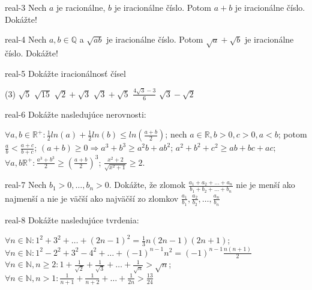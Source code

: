 \begin{defproblem}{real-3}
Nech $a$ je racionálne, $b$ je iracionálne číslo. Potom $a + b$ je
iracionálne číslo. Dokážte!
\end{defproblem}

\begin{defproblem}{real-4}
Nech $a, b \in \mathbb{Q}$ a $\sqrt{ab}$ je iracionálne číslo. Potom
$\sqrt{a} + \sqrt{b}$ je iracionálne číslo. Dokážte!
\end{defproblem}

\begin{defproblem}{real-5}
Dokážte iracionálnosť čísel

\begin{tasks}(3)
  \task $\sqrt{5}$
  \task $\sqrt{15}$
  \task $\sqrt{2} + \sqrt{3}$
  \task $\sqrt{3} + \sqrt{5}$
  \task $\frac{4\sqrt{3} - 3}{6}$
  \task $\sqrt{3} - \sqrt{2}$
\end{tasks}
\end{defproblem}

\begin{defproblem}{real-6}
Dokážte nasledujúce nerovnosti:

\begin{tasks}
  \task $\forall a, b \in \mathbb{R}^{+}: \frac{1}{2} ln(a) + \frac{1}{2} ln(b) \leq ln(\frac{a+b}{2})$;
  \task nech $a \in \mathbb{R}, b > 0, c > 0, a < b$; potom  $\frac{a}{b} < \frac{a + c}{b + c}$;
  \task $(a + b) \geq 0 \Rightarrow a^3 + b^3 \geq a^2 b + ab^2$;
  \task $a^2 + b^2 + c^2 \geq ab + bc + ac$;
  \task $\forall a, b \mathbb{R}^+ : \frac{a^3 + b^3}{2} \geq (\frac{a + b}{2})^3$;
  \task $\frac{x^2 + 2}{\sqrt{x^2 + 1}} \geq 2$.
\end{tasks}
\end{defproblem}

\begin{defproblem}{real-7}
Nech $b_1 > 0, \ldots, b_n > 0$. Dokážte, že zlomok
$\frac{a_1 + a_2 + \ldots + a_n}{b_1 + b_2 + \ldots + b_n}$ nie je menší ako
najmenší a nie je väčší ako najväčší zo zlomkov
$\frac{a_1}{b_1}, \frac{a_2}{b_2}, \ldots, \frac{a_n}{b_n}$
\end{defproblem}

\begin{defproblem}{real-8}
Dokážte nasledujúce tvrdenia:

\begin{tasks}
  \task $\forall n \in \mathbb{N}: 1^2 + 3^2 + \ldots + (2n - 1)^2 =
         \frac{1}{3} n(2n - 1)(2n + 1)$;
  \task $\forall n \in \mathbb{N}: 1^2 - 2^2 + 3^2 - 4^2 + \ldots +
         (-1)^{n-1}n^2 = (-1)^{n-1}\frac{n(n + 1)}{2}$
  \task $\forall n \in \mathbb{N}, n \geq 2: 1 + \frac{1}{\sqrt{2}} +
         \frac{1}{\sqrt{3}} + \ldots + \frac{1}{\sqrt{n}} > \sqrt{n}$;
  \task $\forall n \in \mathbb{N}, n > 1: \frac{1}{n+1} + \frac{1}{n+2} +
         \ldots + \frac{1}{2n} > \frac{13}{24}$
\end{tasks}
\end{defproblem}

